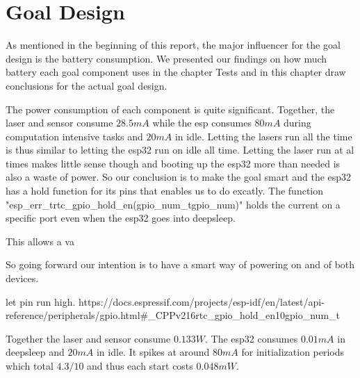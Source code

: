 \section{Goal Design}
As mentioned in the beginning of this report, the major influencer for the goal design is the battery consumption. We presented our findings on how much battery each goal component uses in the chapter Tests and in this chapter draw conclusions for the actual goal design.

The power consumption of each component is quite significant. Together, the laser  and sensor consume $28.5mA$ while the esp consumes $80mA$ during computation intensive tasks and $20mA$ in idle. Letting the lasers run all the time is thus similar to letting the esp32 run on idle all time. Letting the laser run at al times makes little sense though and booting up the esp32 more than needed is also a waste of power. So our conclusion is to make the goal smart and the esp32 has a hold function for its pins that enables us to do excatly\cite{GPIORTCG11esp32letPinsOn:online}. The function "esp_err_trtc_gpio_hold_en(gpio_num_tgpio_num)" holds the current on a specific port even when the esp32 goes into deepsleep.

This allows a va

So going forward our intention is to have a smart way of powering on and of both devices. 



let pin run high.
https://docs.espressif.com/projects/esp-idf/en/latest/api-reference/peripherals/gpio.html#_CPPv216rtc_gpio_hold_en10gpio_num_t




Together the laser and sensor consume $0.133W$. The esp32 consumes $0.01mA$ in deepsleep and $20mA$ in idle. It spikes at around $80mA$ for initialization periods which total $4.3/10$ and thus each start costs $0.048mW$.